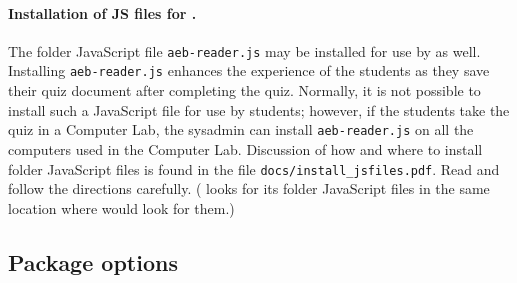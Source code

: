 \documentclass{article}
\begin{document}
\paragraph*{Installation of JS files for .} The folder JavaScript
file \texttt{aeb-reader.js} may be installed for use by  as
well. Installing \texttt{aeb-reader.js} enhances the experience of the
students as they save their quiz document after completing the quiz.
Normally, it is not possible to install such a JavaScript file for use by
students; however, if the students take the quiz in a Computer Lab, the
sysadmin can install \texttt{aeb-reader.js} on all the computers used in the
Computer Lab.  Discussion of how and where to install folder JavaScript files
is found in the file \texttt{docs/install\_jsfiles.pdf}. Read and follow the
directions carefully. ( looks for its folder JavaScript files in
the same location where  would look for them.)


\subsection{Package options}
\end{document}
